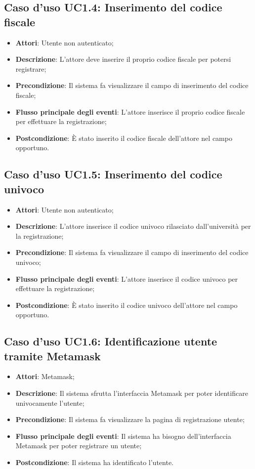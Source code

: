 \subsection{Caso d'uso \texorpdfstring{UC1.4}{UC1.4}: Inserimento del codice fiscale}
\begin{itemize}
	\item \textbf{Attori}: Utente non autenticato;
	\item \textbf{Descrizione}: L'attore deve inserire il proprio codice fiscale per potersi registrare;
	\item \textbf{Precondizione}: Il sistema fa visualizzare il campo di inserimento del codice fiscale;
	\item \textbf{Flusso principale degli eventi}: L'attore inserisce il proprio codice fiscale per effettuare la registrazione;
	\item \textbf{Postcondizione}: È stato inserito il codice fiscale dell'attore nel campo opportuno.
\end{itemize}
\subsection{Caso d'uso \texorpdfstring{UC1.5}{UC1.5}: Inserimento del codice univoco}
\begin{itemize}
	\item \textbf{Attori}: Utente non autenticato;
	\item \textbf{Descrizione}: L'attore inserisce il codice univoco rilasciato dall'università per la registrazione;
	\item \textbf{Precondizione}: Il sistema fa visualizzare il campo di inserimento del codice univoco;
	\item \textbf{Flusso principale degli eventi}: L'attore inserisce il codice univoco per effettuare la registrazione;
	\item \textbf{Postcondizione}: È stato inserito il codice univoco dell'attore nel campo opportuno.
\end{itemize}
\subsection{Caso d'uso \texorpdfstring{UC1.6}{UC1.6}: Identificazione utente tramite Metamask}
\begin{itemize}
	\item \textbf{Attori}: Metamask;
	\item \textbf{Descrizione}: Il sistema sfrutta l'interfaccia Metamask per poter identificare univocamente l'utente;
	\item \textbf{Precondizione}: Il sistema fa visualizzare la pagina di registrazione utente;
	\item \textbf{Flusso principale degli eventi}: Il sistema ha bisogno dell'interfaccia Metamask per poter registrare un utente;
	\item \textbf{Postcondizione}: Il sistema ha identificato l'utente.
\end{itemize}
